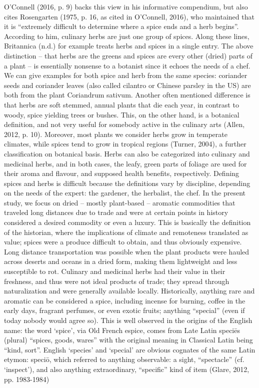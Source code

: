 O'Connell (2016, p. 9) backs this view in his informative compendium, but also cites Rosengarten (1975, p. 16, as cited in O'Connell, 2016), who maintained that it is “extremely difficult to determine where a spice ends and a herb begins”. According to him, culinary herbs are just one group of spices. Along these lines, Britannica (n.d.) for example treats herbs and spices in a single entry.
The above distinction – that herbs are the greens and spices are every other (dried) parts of a plant – is essentially nonsense to a botanist since it echoes the needs of a chef. We can give examples for both spice and herb from the same species: coriander seeds and coriander leaves (also called cilantro or Chinese parsley in the US) are both from the plant Coriandrum sativum. Another often mentioned difference is that herbs are soft stemmed, annual plants that die each year, in contrast to woody, spice yielding trees or bushes. This, on the other hand, is a botanical definition, and not very useful for somebody active in the culinary arts (Allen, 2012, p. 10). Moreover, most plants we consider herbs grow in temperate climates, while spices tend to grow in tropical regions (Turner, 2004), a further classification on botanical basis. Herbs can also be categorized into culinary and medicinal herbs, and in both cases, the leafy, green parts of foliage are used for their aroma and flavour, and supposed health benefits, respectively.
Defining spices and herbs is difficult because the definitions vary by discipline, depending on the needs of the expert: the gardener, the herbalist, the chef. In the present study, we focus on dried – mostly plant-based – aromatic commodities that traveled long distances due to trade and were at certain points in history considered a desired commodity or even a luxury. This is basically the definition of the historian, where the implications of climate and remoteness translated as value; spices were a produce difficult to obtain, and thus obviously expensive. Long distance transportation was possible when the plant products were hauled across deserts and oceans in a dried form, making them lightweight and less susceptible to rot. Culinary and medicinal herbs had their value in their freshness, and thus were not ideal products of trade; they spread through naturalization and were generally available locally. Historically, anything rare and aromatic can be considered a spice, including incense for burning, coffee in the early days, fragrant perfumes, or even exotic fruits; anything “special” (even if today nobody would agree so). This is well observed in the origins of the English name: the word ‘spice’, via Old French espice, comes from Late Latin speciēs (plural) “spices, goods, wares” with the original meaning in Classical Latin being “kind, sort”. English ‘species’ and ‘special’ are obvious cognates of the same Latin etymon: speciō, which referred to anything observable: a sight, “spectacle” (cf. ‘inspect’), and also anything extraordinary, “specific” kind of item (Glare, 2012, pp. 1983-1984)
